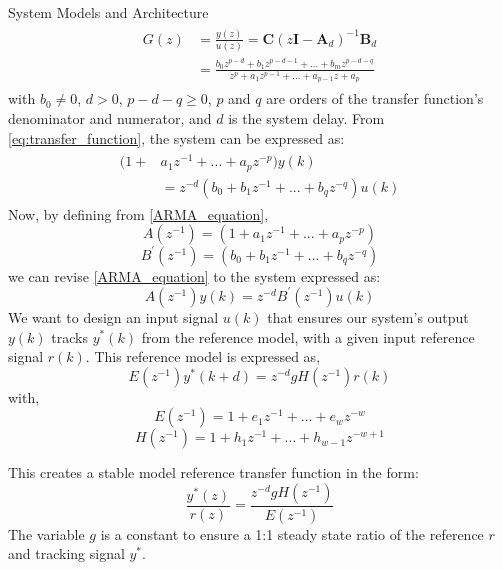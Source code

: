 \begin{section}{System Models and Architecture}
	\begin{align}
	\begin{split}
	\label{eq:transfer_function}
        G(z) & = \frac{y(z)}{u(z)} = \bm{C}(z\bm{I}-\bm{A}_d)^{-1}\bm{B}_d  \\
	& = \frac{b_0z^{p-d}+b_1z^{p-d-1} +...+b_mz^{p-d-q}}{z^{p}+a_1z^{p-1}+...+a_{p-1}z+a_p} 
	\end{split}
	\end{align}
with $b_0\ne{0}$, $d>0$, $p-d-q\geq{0}$, $p$ and $q$ are orders of the transfer function's denominator and numerator, and $d$ is the system delay. From \eqref{eq:transfer_function}, the system can be expressed as:
    \begin{align}
    \begin{split}
    \label{ARMA_equation}
	(1+&a_1z^{-1}+...+a_pz^{-p})y(k) \\
	&=z^{-d}(b_0+b_1z^{-1}+...+b_qz^{-q})u(k)
	\end{split}
	\end{align}
Now, by defining from \eqref{ARMA_equation}, 
	\begin{equation}
	\label{eq:A_q}
	A(z^{-1})=(1+a_1z^{-1}+...+a_pz^{-p})
	\end{equation}
	\begin{equation}
	\label{eq:B_prime}
	B^{'}(z^{-1})=(b_0+b_1z^{-1}+...+b_qz^{-q})
	\end{equation}
we can revise \eqref{ARMA_equation} to the system expressed as:
	\begin{equation}
	\label{eq:ARMA_equation_revise}
	A(z^{-1})y(k)=z^{-d}B^{'}(z^{-1})u(k)
	\end{equation}
We want to design an input signal $u(k)$ that ensures our system's output $y(k)$ tracks $y^*(k)$ from the reference model, with a given input reference signal $r(k)$. This reference model is expressed as,
	\begin{equation}
	\label{eq:reference model_q}
	E(z^{-1})y^*(k+d)=z^{-d}gH(z^{-1})r(k)
	\end{equation}
with,
    \begin{equation}
    \label{eq:E_q}
	E(z^{-1})=1+e_1z^{-1}+ \dots +e_wz^{-w}
	\end{equation}
	\begin{equation}
	H(z^{-1})=1+h_1z^{-1}+ \dots +h_{w-1}z^{-w+1}
	\end{equation}




This creates a stable model reference transfer function in the form:
	\begin{equation}
	\label{eq:reference model_z}
	\frac{y^*(z)}{r(z)}=\frac{z^{-d}gH(z^{-1})}{E(z^{-1})}
	\end{equation}
The variable $g$ is a constant to ensure a 1:1 steady state ratio of the reference $r$ and tracking signal $y^*$. 



\end{section}